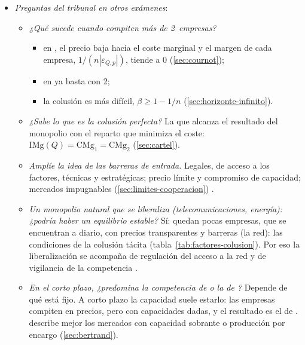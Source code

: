 \documentclass[11pt]{article}
\begin{document}
\begin{itemize}
\begin{itemize}
  \item Mercados impugnables: sin costes hundidos, misma tecnología y retardo de reacción de las instaladas (no hace falta que haya rendimientos constantes).
  \item Clemencia en España (arts.~65~y 66~de la Ley 15/2007): exención para la primera; reducciones del 30-50~\%, del 20-30~\% y de hasta el 20~\%.
  \end{itemize}
\item \emph{Preguntas del tribunal en otros exámenes}:
  \begin{itemize}
  \item \emph{¿Qué sucede cuando compiten más de 2~empresas?}
    \begin{itemize}
    \item en , el precio baja hacia el coste marginal y el margen de cada empresa, $1/(n|\varepsilon_{Q,p}|)$, tiende a 0 (\ref{sec:cournot});
    \item en  ya basta con 2;
    \item la colusión es más difícil, $\beta\geq1-1/n$ (\ref{sec:horizonte-infinito}).
    \end{itemize}
  \item \emph{¿Sabe lo que es la colusión perfecta?} La que alcanza el resultado del monopolio con el reparto que minimiza el coste: $\mathrm{IMg}(Q)=\mathrm{CMg}_1=\mathrm{CMg}_2$ (\ref{sec:cartel}).
  \item \emph{Amplíe la idea de las barreras de entrada.} Legales, de acceso a los factores, técnicas y estratégicas; precio límite y compromiso de capacidad; mercados impugnables (\ref{sec:limites-cooperacion}) .
  \item \emph{Un monopolio natural que se liberaliza (telecomunicaciones, energía): ¿podría haber un equilibrio estable?} Sí: quedan pocas empresas, que se encuentran a diario, con precios transparentes y barreras (la red): las condiciones de la colusión tácita (tabla~\ref{tab:factores-colusion}). Por eso la liberalización se acompaña de regulación del acceso a la red y de vigilancia de la competencia .
  \item \emph{En el corto plazo, ¿predomina la competencia de  o la de ?} Depende de qué está fijo. A corto plazo la capacidad suele estarlo: las empresas compiten en precios, pero con capacidades dadas, y el resultado es el de \nocite{KrepsScheinkman1983Quantity}.  describe mejor los mercados con capacidad sobrante o producción por encargo (\ref{sec:bertrand}).

\end{itemize}
\end{itemize}
\end{document}
